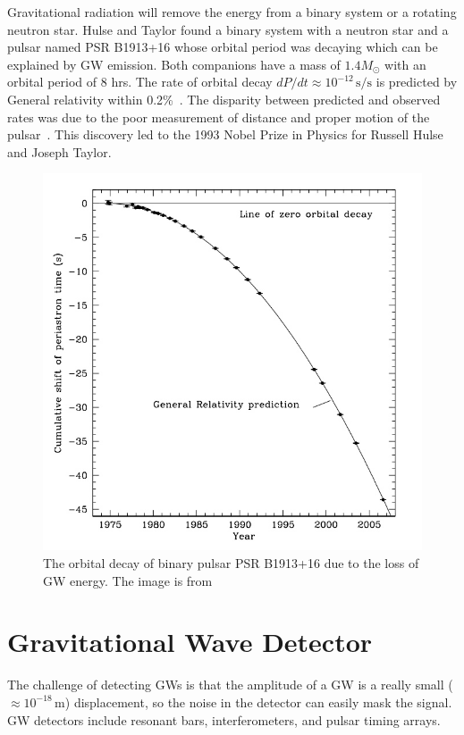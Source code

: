 \documentclass{ttuthes2007}
\begin{document}
Gravitational radiation will remove the energy from a binary system or a
rotating neutron star. Hulse and Taylor\cite{1975ApJ...195L..51H} found a binary system with a
neutron star and a pulsar named PSR B1913+16 whose orbital period was decaying which
can be explained by \acl{GW} emission. Both companions have a mass of $1.4
M_\odot$
with an orbital period of 8 hrs. The rate of orbital decay
$dP/dt\approx10^{-12}$\,$\mathrm{s}/\mathrm{s}$ 
is predicted by General relativity within 0.2\%~\cite{1975ApJ...195L..51H}. The disparity between predicted
and observed rates was due to the poor measurement of distance and proper motion
of the pulsar~\cite{Weisberg_2010}. This discovery led to
the 1993 Nobel Prize in Physics for Russell Hulse and Joseph Taylor.
\begin{figure}[bht!]
	\includegraphics[width=\textwidth]{figure/pulsar.png}
	\caption{The orbital decay of binary pulsar PSR B1913+16 due to the
loss of \ac{GW} energy. The image is from~\cite{Weisberg_2010}}
\end{figure}  

\section{Gravitational Wave Detector}
The challenge of detecting \acp{GW} is that the amplitude of a \ac{GW} is a really small
 ($\approx10^{-18}$\,m) displacement, so the noise in the detector can easily mask the signal.
\ac{GW} detectors include resonant bars, interferometers, and pulsar
timing arrays. 
\end{document}

